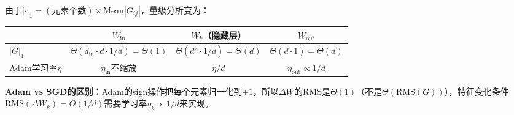 \documentclass[11pt,a4paper]{article}
\begin{document}
由于$|\cdot|_1 = (\text{元素个数})\times\text{Mean}|G_{ij}|$，量级分析变为：

\begin{center}
\renewcommand{\arraystretch}{1.4}
\begin{tabular}{l|ccc}
\toprule
& $W_{\text{in}}$ & $W_k$（隐藏层） & $W_{\text{out}}$ \\
\midrule
$|G|_1$ & $\Theta(d_{\text{in}}\cdot d\cdot 1/d)=\Theta(1)$ & $\Theta(d^2\cdot 1/d)=\Theta(d)$ & $\Theta(d\cdot 1)=\Theta(d)$ \\
Adam学习率$\eta$ & $\eta_{\text{in}}$不缩放 & $\eta/d$ & $\eta_{\text{out}}\propto 1/d$ \\
\bottomrule
\end{tabular}
\end{center}

\textbf{Adam vs SGD的区别：}Adam的sign操作把每个元素归一化到$\pm 1$，所以$\Delta W$的RMS是$\Theta(1)$（不是$\Theta(\text{RMS}(G))$），特征变化条件$\text{RMS}(\Delta W_k)=\Theta(1/d)$需要学习率$\eta_k\propto 1/d$来实现。
\end{document}
